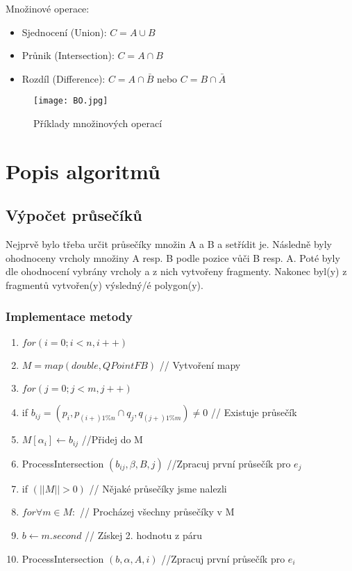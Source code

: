 \documentclass[a4paper, 12pt]{article}
\begin{document}
Množinové operace:
\begin{itemize}
\item Sjednocení (Union): $C = A \cup B$
\item Průnik (Intersection): $C = A \cap B$
\item Rozdíl (Difference): $C = A \cap \bar{B}$ nebo $C = B \cap \bar{A}$
\end{itemize}

\begin{figure}[h]
	\centering
	\texttt{[image: BO.jpg]}
	\caption{Příklady množinových operací}
\end{figure}


\clearpage
\section{Popis algoritmů}

\subsection{Výpočet průsečíků}
Nejprvě bylo třeba určit průsečíky množin A a B a setřídit je. Následně byly ohodnoceny vrcholy množiny A resp. B podle pozice vůči B resp. A. Poté byly dle ohodnocení vybrány vrcholy a z nich vytvořeny fragmenty. Nakonec byl(y) z fragmentů vytvořen(y) výsledný/é polygon(y).

\subsubsection{Implementace metody}
\begin{enumerate}
\item $ for (i = 0; i < n, i++) $ 
\item \hspace {1cm} $ M = map (double, QPointFB) $ // Vytvoření mapy 
\item \hspace {1cm} $ for (j = 0; j < m, j++) $
\item \hspace {2cm} if $ b_{ij} = (p_i, p_{(i+)1\%n} \cap q_j, q_{(j+)1\%m }) \neq 0$ // Existuje průsečík
\item \hspace {3cm} $ M [\alpha_i] \longleftarrow b_{ij}$ //Přidej do M
\item \hspace {3cm} ProcessIntersection $ (b_{ij}, \beta, B, j) $ //Zpracuj první průsečík pro $ e_j $
\item \hspace {1cm} if $(||M|| > 0)$ // Nějaké průsečíky jsme nalezli
\item \hspace{2cm} $  for \forall m \in M: $ // Procházej všechny průsečíky v M
\item  \hspace{3cm} $ b \longleftarrow m.second $ // Získej 2. hodnotu z páru
\item \hspace{3cm} ProcessIntersection $ (b, \alpha, A, i) $ //Zpracuj první průsečík pro $ e_i $
\end{enumerate}
\end{document}
